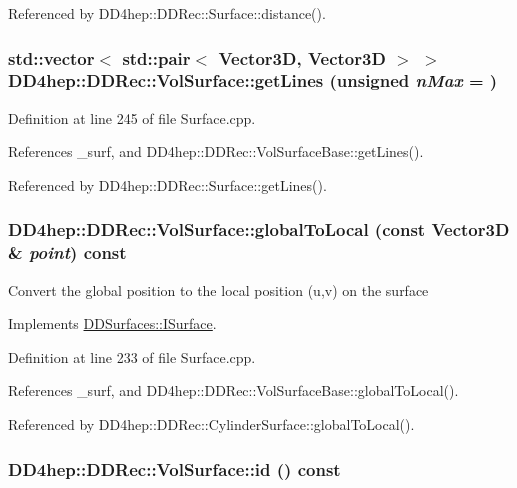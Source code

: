 Referenced by DD4hep::DDRec::Surface::distance().\hypertarget{class_d_d4hep_1_1_d_d_rec_1_1_vol_surface_a0800bcb853b43a688721247dd4031122}{
\subsubsection[{getLines}]{\setlength{\rightskip}{0pt plus 5cm}std::vector$<$ std::pair$<$ {\bf Vector3D}, {\bf Vector3D} $>$ $>$ DD4hep::DDRec::VolSurface::getLines (unsigned {\em nMax} = {})}}
\label{class_d_d4hep_1_1_d_d_rec_1_1_vol_surface_a0800bcb853b43a688721247dd4031122}


Definition at line 245 of file Surface.cpp.

References \_\-surf, and DD4hep::DDRec::VolSurfaceBase::getLines().

Referenced by DD4hep::DDRec::Surface::getLines().\hypertarget{class_d_d4hep_1_1_d_d_rec_1_1_vol_surface_aa4251b5a2eb3f18a84e7b369929b6ba3}{
\subsubsection[{globalToLocal}]{ DD4hep::DDRec::VolSurface::globalToLocal (const {\bf Vector3D} \& {\em point}) const}}
\label{class_d_d4hep_1_1_d_d_rec_1_1_vol_surface_aa4251b5a2eb3f18a84e7b369929b6ba3}
Convert the global position to the local position (u,v) on the surface 

Implements \hyperlink{class_d_d_surfaces_1_1_i_surface_a0d6db86d4871584a9e72ac6018229737}{DDSurfaces::ISurface}.

Definition at line 233 of file Surface.cpp.

References \_\-surf, and DD4hep::DDRec::VolSurfaceBase::globalToLocal().

Referenced by DD4hep::DDRec::CylinderSurface::globalToLocal().\hypertarget{class_d_d4hep_1_1_d_d_rec_1_1_vol_surface_a2f65703996e3212715d994f03afa2242}{
\subsubsection[{id}]{ DD4hep::DDRec::VolSurface::id () const}}
\label{class_d_d4hep_1_1_d_d_rec_1_1_vol_surface_a2f65703996e3212715d994f03afa2242}


